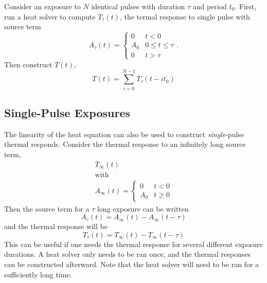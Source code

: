 \documentclass[letterpaper,10pt]{article}
\begin{document}
Consider an exposure to $N$ identical pulses with duration $\tau$ and period $t_0$. First, run a heat solver
to compute $T_\tau(t)$, the termal response to single pulse with source term
\begin{equation}
  A_\tau(t) = \begin{cases}
    0 & t < 0 \\
    A_0 & 0 \le t \le \tau \\
    0 & t > \tau
  \end{cases}.
\end{equation}
Then construct $T(t)$,
\begin{equation}
  T(t) = \sum\limits_{i = 0}^{N-1} T_\tau(t - it_0)
\end{equation}



\subsection{Single-Pulse Exposures}
\label{sub:single_pulse_exposure}

The linearity of the heat equation can also be used to construct \emph{single}-pulse thermal responds. Consider
the thermal response to an infinitely long source term,
\begin{align}
  T_\infty(t) \\
  \text{with} \\
  A_\infty(t) = \begin{cases}
    0 & t < 0 \\
    A_0 & t \ge 0
  \end{cases}
\end{align}
Then the source term for a $\tau$ long exposure can be written
\begin{equation}
  A_\tau(t) = A_\infty(t) - A_\infty(t - \tau)
\end{equation}
and the thermal response will be
\begin{equation}
  T_\tau(t) = T_\infty(t) - T_\infty(t - \tau)
\end{equation}
This can be useful if one needs the thermal response for several different exposure durations. A heat solver
only needs to be ran once, and the thermal responses can be constructed afterward. Note that the heat solver
will need to be ran for a sufficiently long time.
\end{document}
